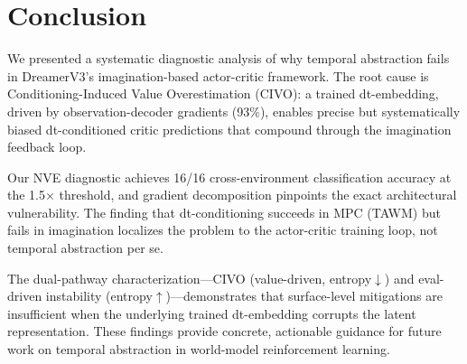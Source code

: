 \documentclass[10pt,letterpaper]{article}
\begin{document}
\section{Conclusion}

We presented a systematic diagnostic analysis of why temporal abstraction fails in DreamerV3's imagination-based actor-critic framework.
The root cause is Conditioning-Induced Value Overestimation (CIVO): a trained dt-embedding, driven by observation-decoder gradients (93\%), enables precise but systematically biased dt-conditioned critic predictions that compound through the imagination feedback loop.

Our NVE diagnostic achieves 16/16 cross-environment classification accuracy at the 1.5$\times$ threshold, and gradient decomposition pinpoints the exact architectural vulnerability.
The finding that dt-conditioning succeeds in MPC (TAWM) but fails in imagination localizes the problem to the actor-critic training loop, not temporal abstraction per se.

The dual-pathway characterization---CIVO (value-driven, entropy$\downarrow$) and eval-driven instability (entropy$\uparrow$)---demonstrates that surface-level mitigations are insufficient when the underlying trained dt-embedding corrupts the latent representation.
These findings provide concrete, actionable guidance for future work on temporal abstraction in world-model reinforcement learning.


\end{document}
